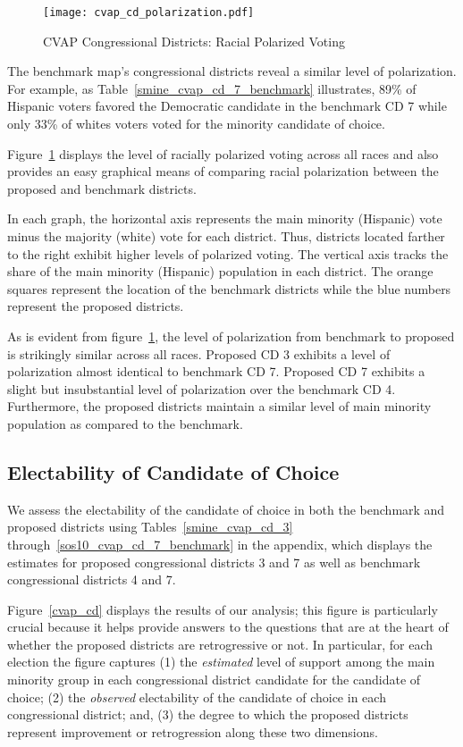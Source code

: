 \documentclass[12pt]{scrartcl}
\begin{document}
\begin{figure}[!h]
\begin{centering}
\texttt{[image: cvap\_cd\_polarization.pdf]}
\caption{CVAP Congressional Districts: Racial Polarized Voting}
\end{centering}
\label{cvap_cd_polarization}
\end{figure}

The benchmark map's congressional districts reveal a similar level of polarization. For example, as Table~\ref{smine_cvap_cd_7_benchmark} illustrates, 89\% of Hispanic voters favored the Democratic candidate in the benchmark CD 7 while only 33\% of whites voters voted for the minority candidate of choice.

Figure~\ref{cvap_cd_polarization} displays the level of racially polarized voting across all races and also provides an easy graphical means of comparing racial polarization between the proposed and benchmark districts.

In each graph, the horizontal axis represents the main minority (Hispanic) vote minus the majority (white) vote for each district. Thus, districts located farther to the right exhibit higher levels of polarized voting. The vertical axis tracks the share of the main minority (Hispanic) population in each district. The orange squares represent the location of the benchmark districts while the blue numbers represent the proposed districts.

As is evident from figure~\ref{cvap_cd_polarization}, the level of polarization from benchmark to proposed is strikingly similar across all races. Proposed CD 3 exhibits a level of polarization almost identical to benchmark CD 7. Proposed CD 7 exhibits a slight but insubstantial level of polarization over the benchmark CD 4. Furthermore, the proposed districts maintain a similar level of main minority population as compared to the benchmark.

\subsection{Electability of Candidate of Choice}
We assess the electability of the candidate of choice in both the benchmark and proposed districts using Tables~\ref{smine_cvap_cd_3} through~\ref{sos10_cvap_cd_7_benchmark} in the appendix, which displays the estimates for proposed congressional districts 3 and 7 as well as benchmark congressional districts 4 and 7.

Figure~\ref{cvap_cd} displays the results of our analysis; this figure is particularly crucial because it helps provide answers to the questions that are at the heart of whether the proposed districts are retrogressive or not. In particular, for each election the figure captures (1) the {\it estimated} level of support  among the main minority group in each congressional district candidate for the candidate of choice; (2) the {\it observed} electability of the candidate of choice in each congressional district; and, (3) the degree to which the proposed districts represent improvement or retrogression along these two dimensions.
\end{document}
